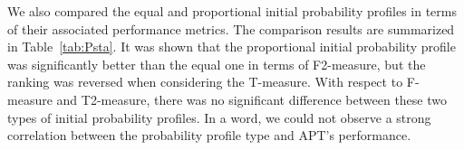 \documentclass[10pt,journal,compsoc]{IEEEtran}
\begin{document}
We also compared the equal and proportional initial probability profiles in terms of their associated performance metrics. The comparison results are summarized in Table~\ref{tab:Psta}.
It was shown that the proportional initial probability profile was significantly better than the equal one in terms of F2-measure, but the ranking was reversed when considering the T-measure. With respect to F-measure and T2-measure, there was no significant difference between these two types of initial probability profiles. In a word, we could not observe a strong correlation between the probability profile type and APT's performance.

\end{document}
